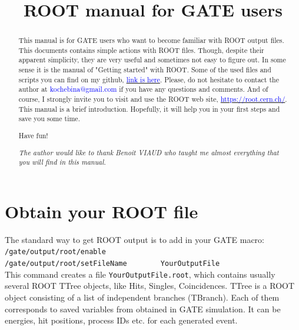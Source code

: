 \documentclass[12pt]{article}
\begin{document}



\title{ROOT manual for GATE users}
\tableofcontents
\newpage
\pagestyle{plain}
\begin{abstract}
This manual is for GATE users who want to become familiar with ROOT output files. This documents contains simple actions with ROOT files. Though, despite their apparent simplicity, they are very useful and sometimes not easy to figure out. In some sense it is the manual of "Getting started" with ROOT. Some of the used files and scripts you can find on my github, \href{https://github.com/kochebina/ROOT_manual_for_Gate_users/tree/master/Materials}{\textcolor{blue}{link is here}}. Please, do not hesitate to contact the author at \textcolor{blue}{kochebina@gmail.com} if you have any questions and comments. And of course, I strongly invite you to visit and use the ROOT web site, \href{https://root.cern.ch/}{\textcolor{blue}{https://root.cern.ch/}}. This manual is a brief introduction. Hopefully, it will help you in your first steps and save you some time.
\begin{center}
Have fun!
\end{center}
 

\vspace*{10cm}

\textit{The author would like to thank Benoit VIAUD who taught me almost everything that you will find in this manual.}   
\end{abstract}



\pagebreak


\section{Obtain your ROOT file}
The standard way to get ROOT output is to add in your GATE macro:
\\
\verb|/gate/output/root/enable | \\
\verb|/gate/output/root/setFileName        YourOutputFile|
\\
This command creates a file \verb|YourOutputFile.root|, which contains usually several ROOT TTree objects, like Hits, Singles, Coincidences. TTree  is a ROOT object consisting of a list of independent branches (TBranch). Each of them corresponds to saved variables from obtained in GATE simulation. It can be energies, hit positions, process IDs etc. for each generated event.  
\end{document}

